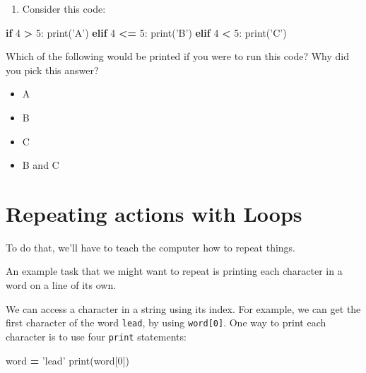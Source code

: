 \documentclass[]{book}
\newenvironment{Shaded}{\begin{snugshade}}{\end{snugshade}}
\newcommand{\BuiltInTok}[1]{#1}
\newcommand{\ControlFlowTok}[1]{\textcolor[rgb]{0.13,0.29,0.53}{\textbf{#1}}}
\newcommand{\DecValTok}[1]{\textcolor[rgb]{0.00,0.00,0.81}{#1}}
\newcommand{\NormalTok}[1]{#1}
\newcommand{\OperatorTok}[1]{\textcolor[rgb]{0.81,0.36,0.00}{\textbf{#1}}}
\newcommand{\StringTok}[1]{\textcolor[rgb]{0.31,0.60,0.02}{#1}}
\providecommand{\tightlist}{%
  \setlength{\itemsep}{0pt}\setlength{\parskip}{0pt}}
\theoremstyle{definition}
\theoremstyle{definition}
\theoremstyle{definition}
\theoremstyle{remark}
\begin{document}
\begin{enumerate}
\def\labelenumi{\arabic{enumi}.}
\setcounter{enumi}{2}
\tightlist
\item
  Consider this code:
\end{enumerate}

\begin{Shaded}
\begin{Highlighting}[]
\ControlFlowTok{if} \DecValTok{4} \OperatorTok{>} \DecValTok{5}\NormalTok{:}
    \BuiltInTok{print}\NormalTok{(}\StringTok{'A'}\NormalTok{)}
\ControlFlowTok{elif} \DecValTok{4} \OperatorTok{<=} \DecValTok{5}\NormalTok{:}
    \BuiltInTok{print}\NormalTok{(}\StringTok{'B'}\NormalTok{)}
\ControlFlowTok{elif} \DecValTok{4} \OperatorTok{<} \DecValTok{5}\NormalTok{:}
    \BuiltInTok{print}\NormalTok{(}\StringTok{'C'}\NormalTok{)}
\end{Highlighting}
\end{Shaded}

Which of the following would be printed if you were to run this code?
Why did you pick this answer?

\begin{itemize}
\tightlist
\item
  A
\item
  B
\item
  C
\item
  B and C
\end{itemize}

\hypertarget{repeating-actions-with-loops}{%
\chapter{Repeating actions with
Loops}\label{repeating-actions-with-loops}}

To do that, we'll have to teach the computer how to repeat things.

An example task that we might want to repeat is printing each character
in a word on a line of its own.

We can access a character in a string using its index. For example, we
can get the first character of the word
\texttt{\textquotesingle{}lead\textquotesingle{}}, by using
\texttt{word{[}0{]}}. One way to print each character is to use four
\texttt{print} statements:

\begin{Shaded}
\begin{Highlighting}[]
\NormalTok{word }\OperatorTok{=} \StringTok{'lead'}
\BuiltInTok{print}\NormalTok{(word[}\DecValTok{0}\NormalTok{])}
\end{Highlighting}
\end{Shaded}
\end{document}
